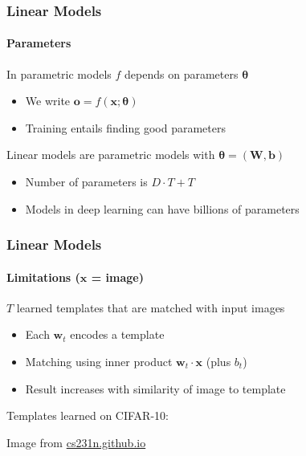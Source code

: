 \documentclass[xetex,professionalfont]{beamer}
\renewcommand\emph[1]{\textcolor{tuwcvl_cvl_blue}{#1}}
\renewcommand{\vec}[1]{\ensuremath{\mathbf{#1}}}
\newcommand{\vb}{\vec{b}}
\newcommand{\vw}{\vec{w}}
\newcommand{\vx}{\vec{x}}
\newcommand{\vo}{\vec{o}}
\newcommand{\vW}{\vec{W}}
\newcommand{\bth}{\boldsymbol{\theta}}
\begin{document}
\begin{frame}
  \frametitle{Linear Models}
  \framesubtitle{Parameters}

In \emph{parametric models} $f$ depends on \emph{parameters} $\bth$
\begin{itemize}
    \item We write $\vo=f(\vx;\bth)$
    \item Training entails finding good parameters
\end{itemize}

\bigskip

Linear models are parametric models with $\bth=(\vW,\vb)$
\begin{itemize}
    \item Number of parameters is $D\cdot T+T$ 
    \item Models in deep learning can have billions of parameters
\end{itemize}

\end{frame}


\begin{frame}
  \frametitle{Linear Models}
  \framesubtitle{Limitations ($\vx$ = image)}

$T$ learned \emph{templates} that are matched with input images %
\begin{itemize}
    \item Each $\vw_t$ encodes a template
    \item Matching using inner product $\vw_t\cdot\vx$ (plus $b_t$) %
    \item Result increases with similarity of image to template
\end{itemize}

\bigskip

Templates learned on CIFAR-10:

\smallskip

\begin{center}
    {\centering Image from \href{http://cs231n.github.io/}{cs231n.github.io}}
\end{center}

\end{frame}
\end{document}
